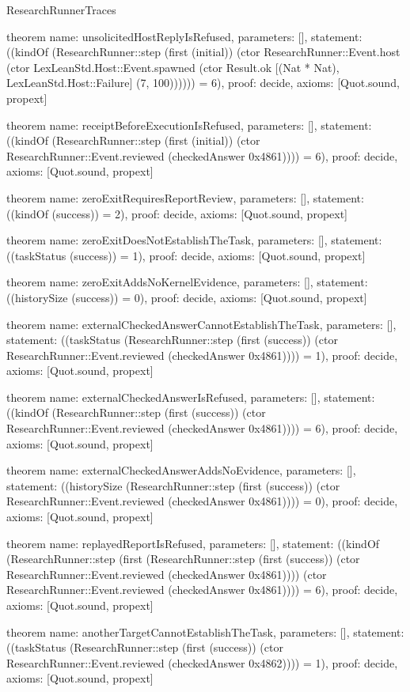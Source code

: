 \begin{lexlean}{ResearchRunnerTraces}
\begin{semanticmodule}
theorem{
  name: unsolicitedHostReplyIsRefused,
  parameters: [],
  statement: ((kindOf (ResearchRunner::step (first (initial)) (ctor ResearchRunner::Event.host (ctor LexLeanStd.Host::Event.spawned (ctor Result.ok [(Nat * Nat), LexLeanStd.Host::Failure] (7, 100)))))) = 6),
  proof: decide{},
  axioms: [Quot.sound, propext]
}

theorem{
  name: receiptBeforeExecutionIsRefused,
  parameters: [],
  statement: ((kindOf (ResearchRunner::step (first (initial)) (ctor ResearchRunner::Event.reviewed (checkedAnswer 0x4861)))) = 6),
  proof: decide{},
  axioms: [Quot.sound, propext]
}

theorem{
  name: zeroExitRequiresReportReview,
  parameters: [],
  statement: ((kindOf (success)) = 2),
  proof: decide{},
  axioms: [Quot.sound, propext]
}

theorem{
  name: zeroExitDoesNotEstablishTheTask,
  parameters: [],
  statement: ((taskStatus (success)) = 1),
  proof: decide{},
  axioms: [Quot.sound, propext]
}

theorem{
  name: zeroExitAddsNoKernelEvidence,
  parameters: [],
  statement: ((historySize (success)) = 0),
  proof: decide{},
  axioms: [Quot.sound, propext]
}

theorem{
  name: externalCheckedAnswerCannotEstablishTheTask,
  parameters: [],
  statement: ((taskStatus (ResearchRunner::step (first (success)) (ctor ResearchRunner::Event.reviewed (checkedAnswer 0x4861)))) = 1),
  proof: decide{},
  axioms: [Quot.sound, propext]
}

theorem{
  name: externalCheckedAnswerIsRefused,
  parameters: [],
  statement: ((kindOf (ResearchRunner::step (first (success)) (ctor ResearchRunner::Event.reviewed (checkedAnswer 0x4861)))) = 6),
  proof: decide{},
  axioms: [Quot.sound, propext]
}

theorem{
  name: externalCheckedAnswerAddsNoEvidence,
  parameters: [],
  statement: ((historySize (ResearchRunner::step (first (success)) (ctor ResearchRunner::Event.reviewed (checkedAnswer 0x4861)))) = 0),
  proof: decide{},
  axioms: [Quot.sound, propext]
}

theorem{
  name: replayedReportIsRefused,
  parameters: [],
  statement: ((kindOf (ResearchRunner::step (first (ResearchRunner::step (first (success)) (ctor ResearchRunner::Event.reviewed (checkedAnswer 0x4861)))) (ctor ResearchRunner::Event.reviewed (checkedAnswer 0x4861)))) = 6),
  proof: decide{},
  axioms: [Quot.sound, propext]
}

theorem{
  name: anotherTargetCannotEstablishTheTask,
  parameters: [],
  statement: ((taskStatus (ResearchRunner::step (first (success)) (ctor ResearchRunner::Event.reviewed (checkedAnswer 0x4862)))) = 1),
  proof: decide{},
  axioms: [Quot.sound, propext]
}


\end{semanticmodule}
\end{lexlean}
